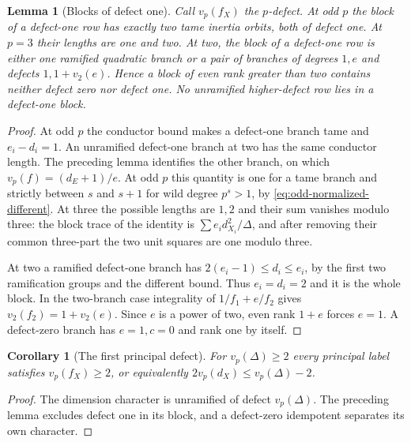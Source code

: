 \documentclass[11pt,a4paper]{article}
\numberwithin{equation}{section}
\newtheorem{lemma}[theorem]{Lemma}
\newtheorem{corollary}[theorem]{Corollary}
\theoremstyle{remark}
\begin{document}
\begin{lemma}[Blocks of defect one]\label{lem:one-defect-block}
Call $v_p(f_X)$ the $p$-defect. At odd $p$ the block of a defect-one row has exactly two tame inertia orbits, both of defect one. At $p=3$ their lengths are one and two.
At two, the block of a defect-one row is either one ramified quadratic branch or a pair of branches of degrees $1,e$ and defects $1,1+v_2(e)$. Hence a block of even rank greater than two contains neither defect zero nor defect one. No unramified higher-defect row lies in a defect-one block.
\end{lemma}\begin{proof}
At odd $p$ the conductor bound makes a defect-one branch tame and $e_i-d_i=1$. An unramified defect-one branch at two has the same conductor length. The preceding lemma identifies the other branch, on which $v_p(f)=(d_E+1)/e$. At odd $p$ this quantity is one for a tame branch and strictly between $s$ and $s+1$ for wild degree $p^s>1$, by \eqref{eq:odd-normalized-different}. At three the possible lengths are $1,2$ and their sum vanishes modulo three: the block trace of the identity is $\sum e_i d_{X_i}^2/\Delta$, and after removing their common three-part the two unit squares are one modulo three.

At two a ramified defect-one branch has $2(e_i-1)\le d_i\le e_i$, by the first two ramification groups and the different bound. Thus $e_i=d_i=2$ and it is the whole block. In the two-branch case integrality of $1/f_1+e/f_2$ gives $v_2(f_2)=1+v_2(e)$. Since $e$ is a power of two, even rank $1+e$ forces $e=1$. A defect-zero branch has $e=1,c=0$ and rank one by itself.
\end{proof}

\begin{corollary}[The first principal defect]\label{cor:principal-valuation-bound}
For $v_p(\Delta)\ge2$ every principal label satisfies
$v_p(f_X)\ge2$, or equivalently $2v_p(d_X)\le v_p(\Delta)-2$.
\end{corollary}\begin{proof}
The dimension character is unramified of defect $v_p(\Delta)$. The preceding lemma excludes defect one in its block, and a defect-zero idempotent separates its own character.
\end{proof}
\end{document}
